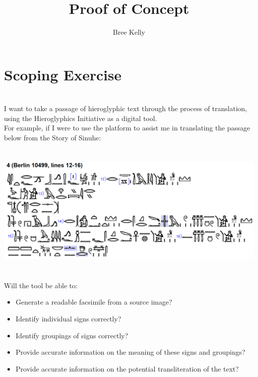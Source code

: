 \documentclass{article}
\begin{document}
\Large{\title{\textbf{Proof of Concept}}}
\author{Bree Kelly} \date{}

\maketitle

\section*{Scoping Exercise}
\paragraph{} ~\\ \large
{}
\newline \break
I want to take a passage of hieroglyphic text through the process of translation, using the Hieroglyphics Initiative as a digital tool.
\newline ~\\
For example, if I were to use the platform to assist me in translating the passage below from the Story of Sinuhe:
\paragraph{}~\\
\includegraphics[width=1.0\textwidth]{hiero_1.PNG}
\paragraph{}~\\
Will the tool be able to:
\newline ~\\
\begin{itemize}  
\item Generate a readable facsimile from a source image?
\item Identify individual signs correctly?
\item Identify groupings of signs correctly?
\item Provide accurate information on the meaning of these signs and groupings?
\item Provide accurate information on the potential transliteration of the text?
\end{itemize}
\end{document}
